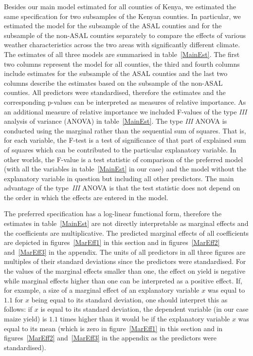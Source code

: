 \documentclass[12pt]{iopart}
\begin{document}
Besides our main model estimated for all counties of Kenya, we estimated the same specification for two subsamples of the Kenyan counties. In particular, we estimated the model for the subsample of the ASAL counties and for the subsample of the non-ASAL counties separately to compare the effects of various weather characteristics across the two areas with significantly different climate. The estimates of all three models are summarised in table~\ref{MainEst}. The first two columns represent the model for all counties, the third and fourth columns include estimates for the subsample of the ASAL counties and the last two columns describe the estimates based on the subsample of the non-ASAL counties. All predictors were standardised, therefore the estimates and the corresponding p-values can be interpreted as measures of relative importance. As an additional measure of relative importance we included F-values of the type \textit{III} analysis of variance (ANOVA) in table~\ref{MainEst}. The type \textit{III} ANOVA is conducted using the marginal rather than the sequential sum of squares. That is, for each variable, the F-test is a test of significance of that part of explained sum of squares which can be contributed to the particular explanatory variable. In other worlds, the F-value is a test statistic of comparison of the preferred model (with all the variables in table~\ref{MainEst} in our case) and the model without the explanatory variable in question but including all other predictors. The main advantage of the type~\textit{III} ANOVA is that the test statistic does not depend on the order in which the effects are entered in the model.

The preferred specification has a log-linear functional form, therefore the estimates in table~\ref{MainEst} are not directly interpretable as marginal effects and the coefficients are multiplicative. The predicted marginal effects of all coefficients are depicted in figures~\ref{MarEff1} in this section and in figures~\ref{MarEff2} and~\ref{MarEff3} in the appendix. The units of all predictors in all three figures are multiples of their standard deviations since the predictors were standardised. For the values of the marginal effects smaller than one, the effect on yield is negative while marginal effects higher than one can be interpreted as a positive effect. If, for example, a size of a marginal effect of an explanatory variable $x$ was equal to $1.1$ for $x$ being equal to its standard deviation, one should interpret this as follows: if $x$ is equal to its standard deviation, the dependent variable (in our case maize yield) is $1.1$ times higher than it would be if the explanatory variable $x$ was equal to its mean (which is zero in figure~\ref{MarEff1} in this section and in figures~\ref{MarEff2} and~\ref{MarEff3} in the appendix as the predictors were standardised). 
\end{document}
